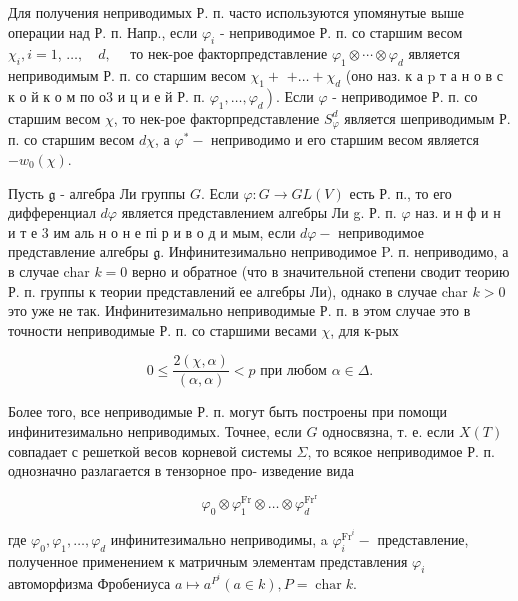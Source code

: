 \documentclass[10pt]{article}
\begin{document}
Для получения неприводимых Р. п. часто используются упомянутые выше операции над Р. п. Напр., если $\varphi_{i}$ - неприводимое Р. п. со старшим весом $\chi_{i}, i=1$, $\ldots, \quad d, \quad$ то нек-рое факторпредставление $\varphi_{1} \otimes \cdots \otimes \varphi_{d}$ является неприводимым Р. п. со старшим весом $\chi_{1}+$ $+\ldots+\chi_{d}$ (оно наз. к а $\mathrm{p}$ т а н о в с к о й к о м по о3 и ц и е й Р. п. $\left.\varphi_{1}, \ldots, \varphi_{d}\right)$. Если $\varphi$ - неприводимое Р. п. со старшим весом $\chi$, то нек-рое факторпредставление $S_{\varphi}^{d}$ является шеприводимым Р. п. со старшим весом $d \chi$, а $\varphi^{*}-$ неприводимо и его старшим весом является $-w_{0}(\chi)$.



Пусть $\mathfrak{g}$ - алгебра Ли группы $G$. Если $\varphi: G \rightarrow G L(V)$ есть Р. п., то его дифференциал $d \varphi$ является представлением алгебры Ли g. Р. п. $\varphi$ наз. и н ф и н и т е 3 им аль н о н е пі р и в о д и мым, если $d \varphi-$ неприводимое представление алгебры $\mathfrak{g}$. Инфинитезимально неприводимое P. п. неприводимо, а в случае char $k=0$ верно и обратное (что в значительной степени сводит теорию Р. п. группы к теории представлений ее алгебры Ли), однако в случае char $k>0$ это уже не так. Инфинитезимально неприводимые Р. п. в этом случае это в точности неприводимые Р. п. со старшими весами $\chi$, для к-рых



\[

0 \leqslant \frac{2(\chi, \alpha)}{(\alpha, \alpha)}<p \text { при любом } \alpha \in \Delta .

\]



Более того, все неприводимые Р. п. могут быть построены при помощи инфинитезимально неприводимых. Точнее, если $G$ односвязна, т. е. если $X(T)$ совпадает с решеткой весов корневой системы $\Sigma$, то всякое неприводимое Р. п. однозначно разлагается в тензорное про- изведение вида



\[

\varphi_{0} \otimes \varphi_{1}^{\mathrm{Fr}} \otimes \ldots \otimes \varphi_{d}^{\mathrm{Fr}^{\mathrm{r}}}

\]



где $\varphi_{0}, \varphi_{1}, \ldots, \varphi_{d}$ инфинитезимально неприводимы, a $\varphi_{i}^{\mathrm{Fr}^{i}}-$ представление, полученное применением к матричным элементам представления $\varphi_{i}$ автоморфизма Фробениуса $a \mapsto a^{P^{i}}(a \in k), P=\operatorname{char} k$.
\end{document}
